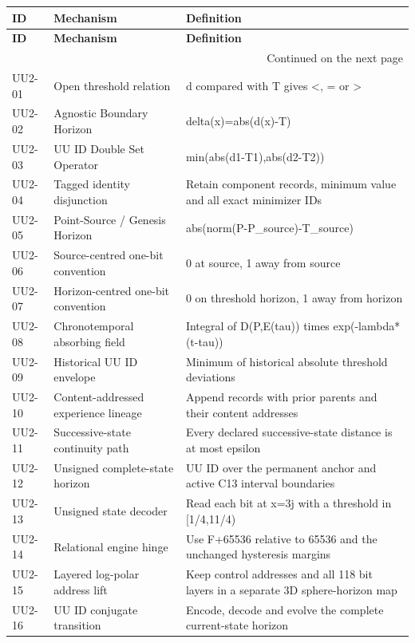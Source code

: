 \begin{longtable}{@{}p{}p{}p{}@{}}
\toprule\textbf{ID} & \textbf{Mechanism} & \textbf{Definition}\\\midrule\endfirsthead
\toprule\textbf{ID} & \textbf{Mechanism} & \textbf{Definition}\\\midrule\endhead
\midrule\multicolumn{3}{r}{\small Continued on the next page}\\\endfoot\bottomrule\endlastfoot
UU2-01 & Open threshold relation & d compared with T gives <, = or >\\[5pt]
UU2-02 & Agnostic Boundary Horizon & delta(x)=abs(d(x)-T)\\[5pt]
UU2-03 & UU ID Double Set Operator & min(abs(d1-T1),abs(d2-T2))\\[5pt]
UU2-04 & Tagged identity disjunction & Retain component records, minimum value and all exact minimizer IDs\\[5pt]
UU2-05 & Point-Source / Genesis Horizon & abs(norm(P-P\_source)-T\_source)\\[5pt]
UU2-06 & Source-centred one-bit convention & 0 at source, 1 away from source\\[5pt]
UU2-07 & Horizon-centred one-bit convention & 0 on threshold horizon, 1 away from horizon\\[5pt]
UU2-08 & Chronotemporal absorbing field & Integral of D(P,E(tau)) times exp(-lambda*(t-tau))\\[5pt]
UU2-09 & Historical UU ID envelope & Minimum of historical absolute threshold deviations\\[5pt]
UU2-10 & Content-addressed experience lineage & Append records with prior parents and their content addresses\\[5pt]
UU2-11 & Successive-state continuity path & Every declared successive-state distance is at most epsilon\\[5pt]
UU2-12 & Unsigned complete-state horizon & UU ID over the permanent anchor and active C13 interval boundaries\\[5pt]
UU2-13 & Unsigned state decoder & Read each bit at x=3j with a threshold in [1/4,11/4)\\[5pt]
UU2-14 & Relational engine hinge & Use F+65536 relative to 65536 and the unchanged hysteresis margins\\[5pt]
UU2-15 & Layered log-polar address lift & Keep control addresses and all 118 bit layers in a separate 3D sphere-horizon map\\[5pt]
UU2-16 & UU ID conjugate transition & Encode, decode and evolve the complete current-state horizon\\[5pt]
\end{longtable}
